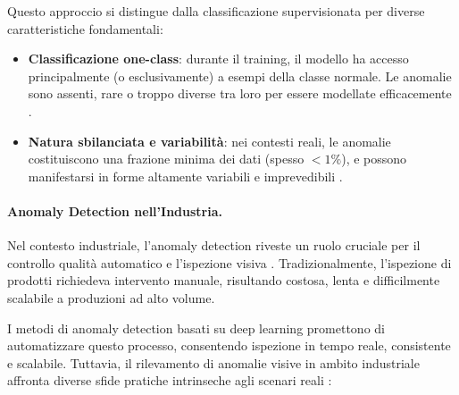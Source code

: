 Questo approccio si distingue dalla classificazione supervisionata per diverse caratteristiche fondamentali:


\begin{itemize}
\item \textbf{Classificazione one-class}: durante il training, il modello ha accesso principalmente (o esclusivamente) a esempi della classe normale. Le a\-no\-ma\-lie sono assenti, rare o troppo diverse tra loro per essere modellate efficacemente \cite{pimentel2014review, tax2004support}.

\item \textbf{Natura sbilanciata e variabilità}: nei contesti reali, le anomalie costituiscono una frazione minima dei dati (spesso $<1\%$), \cite{he2008adasyn} e possono manifestarsi in forme altamente variabili e imprevedibili \cite{bergmann2019mvtec}.
\end{itemize}

\paragraph{Anomaly Detection nell'Industria.}

Nel contesto industriale, l'anomaly de\-tec\-tion riveste un ruolo cruciale per il controllo qualità automatico e l'ispezione visiva \cite{bergmann2020uninformed}. Tradizionalmente, l'ispezione di prodotti richiedeva intervento manuale, risultando costosa, lenta e difficilmente scalabile a pro\-du\-zio\-ni ad alto volume.

I metodi di anomaly detection basati su deep learning promettono di automatizzare questo processo, consentendo ispezione in tempo reale, consistente e scalabile. Tuttavia, il rilevamento di anomalie visive in ambito industriale affronta diverse sfide pratiche intrinseche agli scenari reali \cite{zhuo2025survey, bergmann2019mvtec}:

